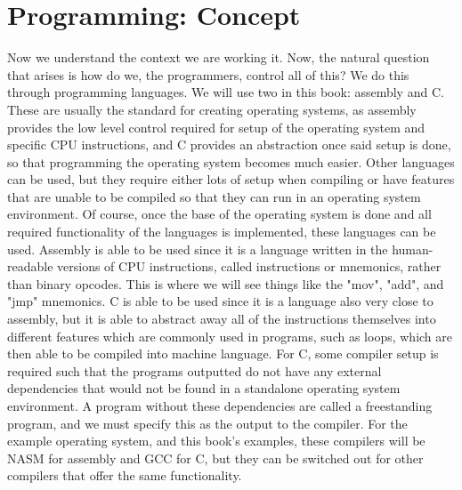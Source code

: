 \documentclass[openany, 12px]{book}
\begin{document}
\section{Programming: Concept}
Now we understand the context we are working it. Now, the natural question that arises is how do we, the programmers, control all of this? We do this through programming languages. We will use two in this book: assembly and C. These are usually the standard for creating operating systems, as assembly provides the low level control required for setup of the operating system and specific CPU instructions, and C provides an abstraction once said setup is done, so that programming the operating system becomes much easier. Other languages can be used, but they require either lots of setup when compiling or have features that are unable to be compiled so that they can run in an operating system environment. Of course, once the base of the operating system is done and all required functionality of the languages is implemented, these languages can be used. Assembly is able to be used since it is a language written in the human-readable versions of CPU instructions, called instructions or mnemonics,  rather than binary opcodes. This is where we will see things like the "mov", "add", and "jmp" mnemonics. C is able to be used since it is a language also very close to assembly, but it is able to abstract away all of the instructions themselves into different features which are commonly used in programs, such as loops, which are then able to be compiled into machine language. For C, some compiler setup is required such that the programs outputted do not have any external dependencies that would not be found in a standalone operating system environment. A program without these dependencies are called a freestanding program, and we must specify this as the output to the compiler. For the example operating system, and this book's examples, these compilers will be NASM for assembly and GCC for C, but they can be switched out for other compilers that offer the same functionality.
\end{document}
